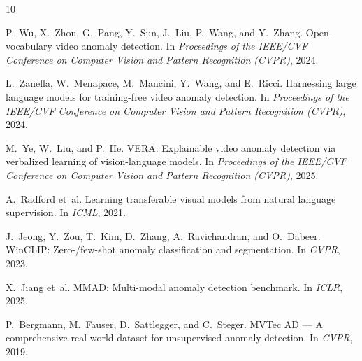\documentclass[12pt, a4paper]{article}
\begin{document}
\begin{thebibliography}{10}

P.~Wu, X.~Zhou, G.~Pang, Y.~Sun, J.~Liu, P.~Wang, and Y.~Zhang.
\newblock Open-vocabulary video anomaly detection.
\newblock In \emph{Proceedings of the IEEE/CVF Conference on Computer Vision and Pattern Recognition (CVPR)}, 2024.

L.~Zanella, W.~Menapace, M.~Mancini, Y.~Wang, and E.~Ricci.
\newblock Harnessing large language models for training-free video anomaly detection.
\newblock In \emph{Proceedings of the IEEE/CVF Conference on Computer Vision and Pattern Recognition (CVPR)}, 2024.

M.~Ye, W.~Liu, and P.~He.
\newblock VERA: Explainable video anomaly detection via verbalized learning of vision-language models.
\newblock In \emph{Proceedings of the IEEE/CVF Conference on Computer Vision and Pattern Recognition (CVPR)}, 2025.

A.~Radford et~al.
\newblock Learning transferable visual models from natural language supervision.
\newblock In \emph{ICML}, 2021.

J.~Jeong, Y.~Zou, T.~Kim, D.~Zhang, A.~Ravichandran, and O.~Dabeer.
\newblock WinCLIP: Zero-/few-shot anomaly classification and segmentation.
\newblock In \emph{CVPR}, 2023.

X.~Jiang et~al.
\newblock MMAD: Multi-modal anomaly detection benchmark.
\newblock In \emph{ICLR}, 2025.

P.~Bergmann, M.~Fauser, D.~Sattlegger, and C.~Steger.
\newblock MVTec AD --- A comprehensive real-world dataset for unsupervised anomaly detection.
\newblock In \emph{CVPR}, 2019.

\end{thebibliography}
\end{document}
